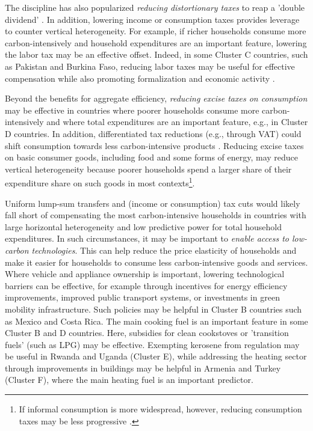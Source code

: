 \documentclass[12pt, a4paper]{article}
\begin{document}
The discipline has also popularized \textit{reducing distortionary taxes} to reap a 'double dividend' \autocite{Bovenberg.1996}. In addition, lowering income or consumption taxes provides leverage to counter vertical heterogeneity. For example, if richer households consume more carbon-intensively and household expenditures are an important feature, lowering the labor tax may be an effective offset. Indeed, in some Cluster C countries, such as Pakistan and Burkina Faso, reducing labor taxes may be useful for effective compensation while also promoting formalization \autocite{Jessen.2021,Rocha.2018} and economic activity \autocite{Ulyssea.2018}.

Beyond the benefits for aggregate efficiency, \textit{reducing excise taxes on consumption} may be effective in countries where poorer households consume more carbon-intensively and where total expenditures are an important feature, e.g., in Cluster D countries. In addition, differentiated tax reductions (e.g., through VAT) could shift consumption towards less carbon-intensive products \autocite{Klenert.2023}. Reducing excise taxes on basic consumer goods, including food and some forms of energy, may reduce vertical heterogeneity because poorer households spend a larger share of their expenditure share on such goods in most contexts\footnote{If informal consumption is more widespread, however, reducing consumption taxes may be less progressive \autocite{Bachas.2020}.}. 

Uniform lump-sum transfers and (income or consumption) tax cuts would likely fall short of compensating the most carbon-intensive households in countries with large horizontal heterogeneity and low predictive power for total household expenditures. In such circumstances, it may be important to \textit{enable access to low-carbon technologies}. This can help reduce the price elasticity of households and make it easier for households to consume less carbon-intensive goods and services. Where vehicle and appliance ownership is important, lowering technological barriers can be effective, for example through incentives for energy efficiency improvements, improved public transport systems, or investments in green mobility infrastructure. Such policies may be helpful in Cluster B countries such as Mexico and Costa Rica. %
The main cooking fuel is an important feature in some Cluster B and D countries. Here, subsidies for clean cookstoves or 'transition fuels' (such as LPG) may be effective. Exempting kerosene from regulation may be useful in Rwanda and Uganda (Cluster E), while addressing the heating sector through improvements in buildings may be helpful in Armenia and Turkey (Cluster F), where the main heating fuel is an important predictor. %
\end{document}
